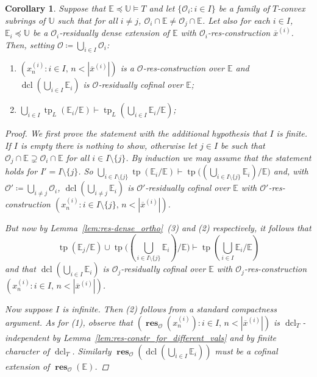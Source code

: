 \documentclass{amsart}
\newtheorem{corollary}[theorem]{Corollary}
\theoremstyle{remark}
\theoremstyle{definition}
\theoremstyle{plain}
\newcommand{\bE}{\mathbb E}
\newcommand{\bU}{\mathbb U}
\newcommand{\cO}{\mathcal O}
\DeclareMathOperator{\res}{\mathbf{res}}
\DeclareMathOperator{\tp}{\mathrm{tp}}
\DeclareMathOperator{\dcl}{\mathrm{dcl}}
\theoremstyle{plain}
\begin{document}
\begin{corollary}\label{cor:res-dense_ortho}
    Suppose that $\bE \preceq \bU \models T$ and let $\{\cO_i: i \in I\}$ be a family of $T$-convex subrings of $\bU$ such that for all $i \neq j$, $\cO_i \cap \bE \neq \cO_j \cap \bE$. Let also for each $i \in I$, $\bE_i\preceq \bU$ be a $\cO_i$-residually dense extension of $\bE$ with $\cO_i$-res-construction $\overline{x}^{(i)}$. Then, setting $\cO\coloneqq \bigcup_{i \in I} \cO_i$: 
    \begin{enumerate}
        \item $(x^{(i)}_n: i \in I, \, n < |\overline{x}^{(i)}|)$ is a $\cO$-res-construction over $\bE$ and $\dcl(\bigcup_{i \in I} \bE_i)$ is $\cO$-residually cofinal over $\bE$;
        \item $\bigcup_{i \in I} \tp_L(\bE_i/\bE) \vdash \tp_L(\bigcup_{i \in I}\bE_i/\bE)$;
    \end{enumerate}
    \begin{proof}

        We first prove the statement with the additional hypothesis that $I$ is finite.
        If $I$ is empty there is nothing to show, otherwise let $j\in I$ be such that $\cO_j\cap \bE \supsetneq \cO_{i}\cap \bE$ for all $i\in I\setminus \{j\}$.
        By induction we may assume that the statement holds for $I'= I \setminus \{j\}$. So $\bigcup_{i \in I\setminus \{j\}} \tp(\bE_i/\bE) \vdash \tp\big((\bigcup_{i \in I\setminus \{j\}} \bE_i)/ \bE\big)$ and, with $\cO'\coloneqq  \bigcup_{i \neq j} \cO_i$, $\dcl(\bigcup_{i \neq j} \bE_i)$ is $\cO'$-residually cofinal over $\bE$ with $\cO'$-res-construction $(x^{(i)}_n: i \in I\setminus \{j\}, \, n < |\overline{x}^{(i)}|)$.

        But now by Lemma~\ref{lem:res-dense_ortho}~(3) and (2) respectively, it follows that
        \[\tp(\bE_j/\bE) \cup \tp\big((\bigcup_{i \in I\setminus \{j\}} \bE_i)/ \bE\big)\vdash \tp(\bigcup_{i\in I} \bE_i/\bE)\]
        and that $\dcl(\bigcup_{i \in I} \bE_i)$ is $\cO_j$-residually cofinal over $\bE$ with $\cO_j$-res-construction $(x^{(i)}_n: i \in I, \, n < |\overline{x}^{(i)}|)$.

        Now suppose $I$ is infinite. Then (2) follows from a standard compactness argument. As for (1), observe that $(\res_{\cO}(x^{(i)}_n): i \in I, \, n < |\overline{x}^{(i)}|)$ is $\dcl_T$-independent by Lemma~\ref{lem:res-constr_for_different_vals} and by finite character of $\dcl_T$. Similarly $\res_\cO(\dcl(\bigcup_{i \in I}\bE_i))$ must be a cofinal extension of $\res_\cO(\bE)$.
    \end{proof}
\end{corollary}
\end{document}

